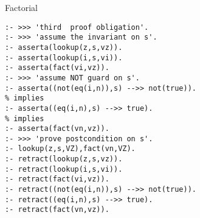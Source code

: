 \documentclass{beamer}
\begin{document}
\begin{frame}[fragile]{Factorial}

\scriptsize
\begin{verbatim}
:- >>> 'third  proof obligation'.
:- >>> 'assume the invariant on s'.
:- asserta(lookup(z,s,vz)).                                                                        
:- asserta(lookup(i,s,vi)).
:- asserta(fact(vi,vz)).
:- >>> 'assume NOT guard on s'.
:- asserta((not(eq(i,n)),s) -->> not(true)).
% implies
:- asserta((eq(i,n),s) -->> true).
% implies
:- asserta(fact(vn,vz)).
:- >>> 'prove postcondition on s'.
:- lookup(z,s,VZ),fact(vn,VZ).
:- retract(lookup(z,s,vz)).                                                                        
:- retract(lookup(i,s,vi)).
:- retract(fact(vi,vz)).
:- retract((not(eq(i,n)),s) -->> not(true)).
:- retract((eq(i,n),s) -->> true).
:- retract(fact(vn,vz)).
\end{verbatim}
\end{frame}
\end{document}
